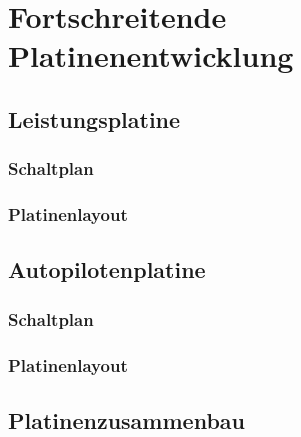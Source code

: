 \chapter{Fortschreitende Platinenentwicklung}\label{cha:Platinenentwicklung}

\section{Leistungsplatine}

\subsection{Schaltplan}

\subsection{Platinenlayout}

\section{Autopilotenplatine}

\subsection{Schaltplan}

\subsection{Platinenlayout}

\section{Platinenzusammenbau}